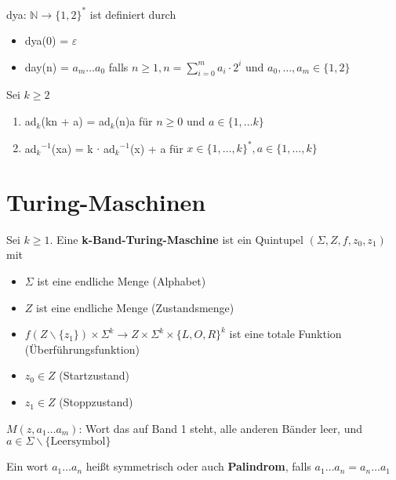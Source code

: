 \documentclass[14pt]{article}
\begin{document}
\begin{definition}
    dya: $\mathbb{N} \rightarrow \{ 1, 2\}^*$ ist definiert durch
    \begin{itemize}
        \item dya(0) = $\varepsilon$
        \item day(n) = $a_m \dots a_0$ falls $n \geq 1, n = \sum_{i = 0}^m
                  a_i \cdot 2^i$ und $a_0, \dots, a_m \in \{ 1, 2 \}$
    \end{itemize}
\end{definition}

\begin{eigenschaft}
    Sei $k \geq 2$
    \begin{enumerate}
        \item ad$_k$(kn + a) = ad$_k$(n)a für $n \geq 0$ und $a \in \{ 1, \dots k\}$
        \item ad$_k$$^{-1}$(xa) = k $\cdot$ ad$_k$$^{-1}$(x) + a
                      für $x \in \{ 1, \dots, k\}^*, a \in \{ 1, \dots, k \}$
    \end{enumerate}
\end{eigenschaft}

\section{Turing-Maschinen}
\begin{definition}
    Sei $k \geq 1$. Eine \textbf{k-Band-Turing-Maschine} ist
    ein Quintupel $(\varSigma, Z, f, z_0, z_1)$ mit
    \begin{itemize}
        \item $\varSigma$ ist eine endliche Menge (Alphabet)
        \item $Z$ ist eine endliche Menge (Zustandsmenge)
        \item $f(Z \backslash \{ z_1\}) \times \varSigma^k \rightarrow
                  Z \times \varSigma^k \times \{ L, O, R \}^k$ ist eine totale Funktion
              (Überführungsfunktion)
        \item $z_0 \in Z$ (Startzustand)
        \item $z_1 \in Z$ (Stoppzustand)
    \end{itemize}
    $M(z, a_1 \dots a_m)$: Wort das auf Band 1 steht, alle anderen
    Bänder leer, und $a \in \varSigma \backslash \{ \text{Leersymbol} \}$
\end{definition}
\begin{definition}[Palindrom]
    Ein wort $a_1 \dots a_n$ heißt symmetrisch oder auch
    \textbf{Palindrom}, falls $a_1 \dots a_n = a_n \dots a_1$
\end{definition}
\end{document}
